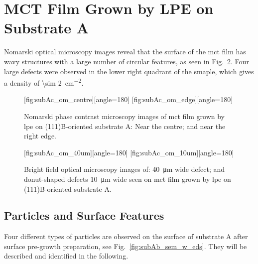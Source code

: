 \clearpage
\section{MCT Film Grown by LPE on Substrate A}\label{sec:subAc}

Nomarski optical microscopy images reveal that the surface of the \ac{mct} film has wavy structures with a large number of circular features, as seen in Fig.~\ref{fig:subAc_om}. Four large defects were observed in the lower right quadrant of the smaple, which gives a density of \SI{\sim 2}{\centi\metre^{-2}}.

\begin{figure}[htbp]
    \centering
    [fig:subAc_om_centre][angle=180]
    \hfill
    [fig:subAc_om_edge][angle=180]
    \caption[Nomarski phase contrast microscopy images of \ac{mct} film grown by \ac{lpe} on substrate A.]{Nomarski phase contrast microscopy images of \ac{mct} film grown by \ac{lpe} on (111)B-oriented substrate A:  Near the centre; and  near the right edge.}
    \label{fig:subAc_om}
\end{figure}

\begin{figure}[htbp]
    \centering
    [fig:subAc_om_40um][angle=180]
    \hfill
    [fig:subAc_om_10um][angle=180]
    \caption[Bright field optical microscopy images of defects seen on \ac{mct} film grown by \ac{lpe} on substrate A.]{Bright field optical microscopy images of:  \SI{40}{\micro\metre} wide defect; and  donut-shaped defects \SI{10}{\micro\metre} wide seen on \ac{mct} film grown by \ac{lpe} on (111)B-oriented substrate A.}
    \label{fig:subAc_om}
\end{figure}

\subsection{Particles and Surface Features}
Four different types of particles are observed on the surface of substrate A after surface pre-growth preparation, see Fig.~\ref{fig:subAb_sem_w_eds}. They will be described and identified in the following.

